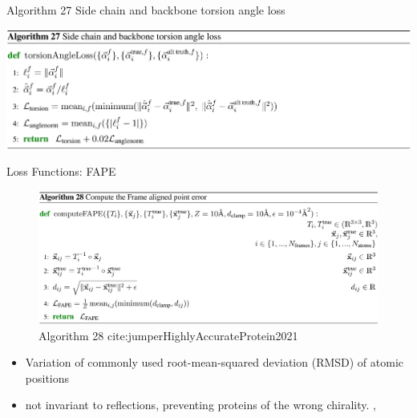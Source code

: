 \documentclass[presentation, smaller]{beamer}
\begin{document}
\begin{frame}[label={sec:orga018bae}]{Algorithm 27 Side chain and backbone torsion angle loss \cite{jumperHighlyAccurateProtein2021}}
\begin{center}
\includegraphics[width=.9\linewidth]{./imgs/algo27_sidechain-backbonetorsion-loss.png}
\end{center}
\end{frame}
\begin{frame}[label={sec:orgc33c6d3}]{Loss Functions: FAPE}
\begin{figure}[htbp]
\centering
\includegraphics[width=.9\linewidth]{./imgs/algo28_fape.png}
{Algorithm 28 cite:jumperHighlyAccurateProtein2021}
\end{figure}


\begin{itemize}
\item Variation of commonly used root-mean-squared deviation (RMSD) of atomic positions
\item not invariant to reflections, preventing proteins of the wrong chirality. \cite{rubieraAlphaFoldHereWhat}, \cite{jumperHighlyAccurateProtein2021}
\end{itemize}
\end{frame}
\end{document}
